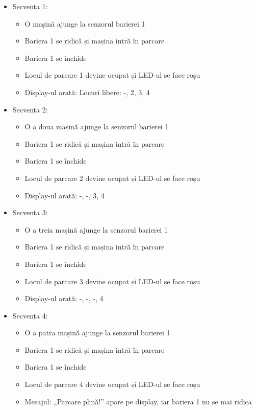 \documentclass[a4paper,11pt]{report}
\begin{document}
\begin{itemize} \item Secvența 1: \begin{itemize} \item O mașină ajunge la senzorul barierei 1 \item Bariera 1 se ridică și mașina intră în parcare \item Bariera 1 se închide \item Locul de parcare 1 devine ocupat și LED-ul se face roșu \item Display-ul arată: Locuri libere: -, 2, 3, 4 \end{itemize}

\item Secvența 2: \begin{itemize} \item O a doua mașină ajunge la senzorul barierei 1 \item Bariera 1 se ridică și mașina intră în parcare \item Bariera 1 se închide \item Locul de parcare 2 devine ocupat și LED-ul se face roșu \item Display-ul arată: -, -, 3, 4 \end{itemize}

\item Secvența 3: \begin{itemize} \item O a treia mașină ajunge la senzorul barierei 1 \item Bariera 1 se ridică și mașina intră în parcare \item Bariera 1 se închide \item Locul de parcare 3 devine ocupat și LED-ul se face roșu \item Display-ul arată: -, -, -, 4 \end{itemize}

\item Secvența 4: \begin{itemize} \item O a patra mașină ajunge la senzorul barierei 1 \item Bariera 1 se ridică și mașina intră în parcare \item Bariera 1 se închide \item Locul de parcare 4 devine ocupat și LED-ul se face roșu \item Mesajul: „Parcare plină!” apare pe display, iar bariera 1 nu se mai ridica\end{itemize}


\end{itemize}
\end{document}
